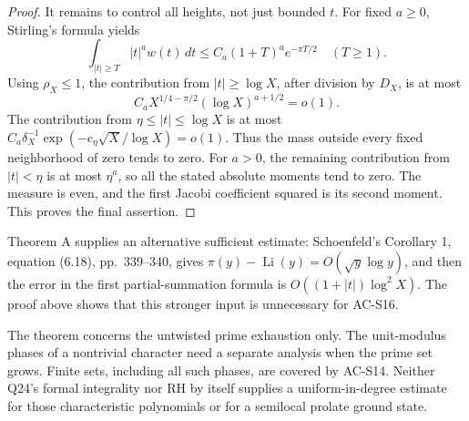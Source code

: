 \begin{proof}
It remains to control all heights, not just bounded \(t\).
For fixed \(a\geq0\), Stirling's formula yields
\[
 \int_{|t|\geq T}|t|^a w(t)\,dt
       \leq C_a(1+T)^a e^{-\pi T/2}\quad(T\geq1).
\]
Using \(\rho_X\leq1\), the contribution from \(|t|\geq\log X\),
after division by \(D_X\), is at most
\[
 C_a X^{1/4-\pi/2}(\log X)^{a+1/2}=o(1).
\]
The contribution from \(\eta\leq|t|\leq\log X\) is at most
\(C_a\delta_X^{-1}\exp(-c_\eta\sqrt X/\log X)=o(1)\).
Thus the mass outside every fixed neighborhood of zero tends to zero.
For \(a>0\), the remaining contribution from \(|t|<\eta\) is
at most \(\eta^a\), so all the stated absolute moments tend to zero.
The measure is even, and the first Jacobi coefficient squared is its
second moment.  This proves the final assertion.
\end{proof}

Theorem A supplies an alternative sufficient estimate:
Schoenfeld's Corollary 1, equation (6.18), pp.~339--340, gives
\(\pi(y)-\operatorname{Li}(y)=O(\sqrt y\log y)\), and then the
error in the first partial-summation formula is
\(O((1+|t|)\log^2X)\).  The proof above shows that this stronger
input is unnecessary for AC-S16.

The theorem concerns the untwisted prime exhaustion only.  The
unit-modulus phases of a nontrivial character need a separate
analysis when the prime set grows.  Finite sets, including all such
phases, are covered by AC-S14.  Neither Q24's formal integrality nor
RH by itself supplies a uniform-in-degree estimate for those
characteristic polynomials or for a semilocal prolate ground state.

